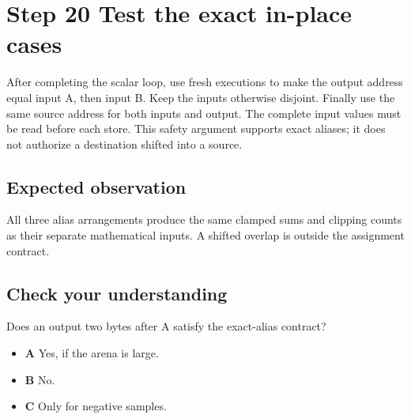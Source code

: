 \section{Step 20 Test the exact in-place cases}\label{pcm-s20}

After completing the scalar loop, use fresh executions to make the output address equal input A, then input B. Keep the inputs otherwise disjoint. Finally use the same source address for both inputs and output. The complete input values must be read before each store. This safety argument supports exact aliases; it does not authorize a destination shifted into a source.

\subsection{Expected observation}
All three alias arrangements produce the same clamped sums and clipping counts as their separate mathematical inputs. A shifted overlap is outside the assignment contract.

\subsection{Check your understanding}
Does an output two bytes after A satisfy the exact-alias contract?

\begin{itemize}
  \item \textbf{A} Yes, if the arena is large.
  \item \textbf{B} No.
  \item \textbf{C} Only for negative samples.
\end{itemize}
